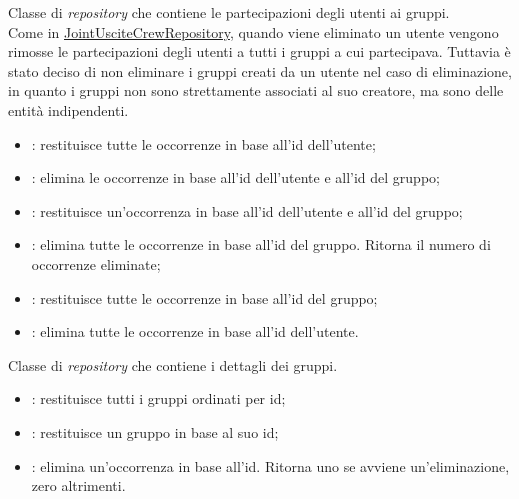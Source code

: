 \label{JointUtentiCrewRepository}
Classe di \textit{repository} che contiene le partecipazioni degli utenti ai gruppi. \\
Come in \hyperref[JointUsciteCrewRepository]{JointUsciteCrewRepository}, quando viene eliminato un utente vengono rimosse le partecipazioni degli utenti a tutti i gruppi a cui partecipava. Tuttavia è stato deciso di non eliminare i gruppi creati da un utente nel caso di eliminazione, in quanto i gruppi non sono strettamente associati al suo creatore, ma sono delle entità indipendenti.
\begin{itemize}
    \item {}: restituisce tutte le occorrenze in base all'id dell'utente;
    \item {}: elimina le occorrenze in base all'id dell'utente e all'id del gruppo;
    \item {}: restituisce un'occorrenza in base all'id dell'utente e all'id del gruppo;
    \item {}: elimina tutte le occorrenze in base all'id del gruppo. Ritorna il numero di occorrenze eliminate;
    \item {}: restituisce tutte le occorrenze in base all'id del gruppo;
    \item {}: elimina tutte le occorrenze in base all'id dell'utente.
    
\end{itemize} 






\label{CrewRepository}
Classe di \textit{repository} che contiene i dettagli dei gruppi. \\
\begin{itemize}
    \item {}: restituisce tutti i gruppi ordinati per id;
    \item {}: restituisce un gruppo in base al suo id;
    \item {}: elimina un'occorrenza in base all'id. Ritorna uno se avviene un'eliminazione, zero altrimenti.
\end{itemize}


